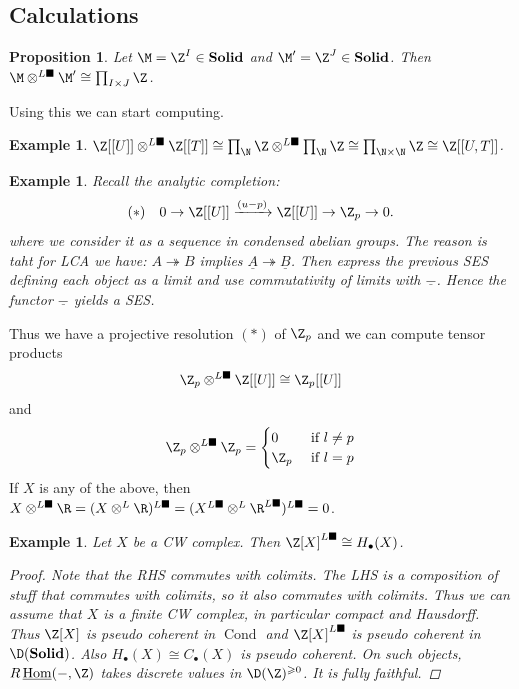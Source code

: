 \documentclass[A4paper, british]{amsart}
\theoremstyle{darkgreentheorem}
\newtheorem{prop}[thm]{Proposition}
\theoremstyle{darkbluedefinition}
\theoremstyle{darkredexample}
\newtheorem{exa}[thm]{Example}
\theoremstyle{remark}
\DeclareMathOperator{\Cond}{Cond}
\DeclareMathOperator{\ihom}{\underline{Hom}}
\newcommand{\Solid}{\mathbf{Solid}}
\newcommand{\1}{\mathbbm{1}}
\renewcommand{\u}[1]{\underline{#1}}
\newcommand{\ot}{\otimes}
\newcommand{\tms}{\times}
\newcommand{\epi}{\twoheadrightarrow}
\newcommand{\dsolid}{^{L\blacksquare}}
\begin{document}
\subsection{Calculations}

\begin{prop}
    Let $\M=\Z^{I}\in \Solid$ and $\M'=\Z^{J}\in \Solid$.
    Then $\M\ot\dsolid \M'\cong \prod_{I\tms J} \Z $.
\end{prop}

Using this we can start computing.

\begin{exa}
    $\Z[[U]]\ot\dsolid \Z[[T]]\cong \prod_{\N}\Z\ot\dsolid \prod_{\N}\Z \cong \prod_{\N\tms\N}\Z\cong \Z[[U,T]]$.
\end{exa}

\begin{exa}
    Recall the analytic completion:
    \[ (*) \quad 0\to \Z[[U]]\xrightarrow{(u-p)}\Z[[U]]\to \Z_{p}\to 0.\]
    where we consider it as a sequence in condensed abelian groups.
    The reason is taht for LCA we have: $A\epi B$ implies $\u{A}\epi \u{B}$.
    Then express the previous SES defining each object as a limit and use commutativity of limits with $\u{-}$.
    Hence the functor $\u{-}$ yields a SES.
\end{exa}

Thus we have a projective resolution $(*)$ of $\Z_{p}$ and we can compute tensor products
\[ \Z_{p}\ot\dsolid \Z[[U]] \cong \Z_{p}[[U]] \]
and
\[ \Z_{p}\ot \dsolid \Z_{p}=\begin{cases} 0 &\text{ if } l\neq p \\ \Z_{p} & \text{ if } l=p\end{cases} \]
If $X$ is any of the above, then $X\ot\dsolid \R=(X\ot^{L}\R)\dsolid=(X\dsolid\ot^{L}\R\dsolid)\dsolid=0$.

\begin{exa}
    Let $X$ be a CW complex.
    Then $\Z[X]\dsolid \cong H_{\bullet}(X)$.
    \begin{proof}
	Note that the RHS commutes with colimits.
	The LHS is a composition of stuff that commutes with colimits, so it also commutes with colimits.
	Thus we can assume that $X$ is a finite CW complex, in particular compact and Hausdorff.
	Thus $\Z[X]$ is pseudo coherent in $\Cond$ and $\Z[X]\dsolid$ is pseudo coherent in $\D(\Solid)$.
	Also $H_{\bullet}(X)\cong C_{\bullet}(X)$ is pseudo coherent.
	On such objects, $R\ihom(-,\Z)$ takes discrete values in $\D(\Z)^{\geqslant 0}$.
	It is fully faithful.
    \end{proof}
\end{exa}
\end{document}

